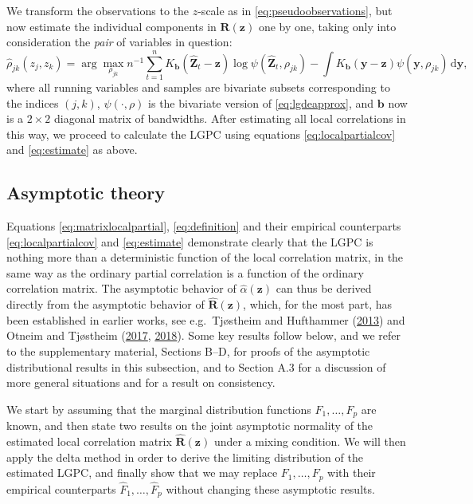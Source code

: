 \documentclass[
  12pt,
  letterpaper]{article}
\newcommand{\z}{\bm{z}}
\newcommand{\hZ}{\widehat{\bm{Z}}}
\newcommand{\y}{\bm{y}}
\newcommand{\R}{\bm{R}}
\newcommand{\hR}{\widehat{\bm{R}}}
\newcommand{\hF}{\widehat{F}}
\newcommand{\hrho}{\widehat{\rho}}
\newcommand{\hh}{\bm{b}}
\newcommand{\halpha}{\widehat{\alpha}}
\theoremstyle{definition}
\theoremstyle{definition}
\theoremstyle{definition}
\theoremstyle{remark}
\begin{document}
We transform the observations to the \(z\)-scale as in \eqref{eq:pseudoobservations}, but now estimate the individual components in \(\R(\z)\) one by one, taking only into consideration the \emph{pair} of variables in question:
\begin{equation}
\hrho_{jk}(z_j, z_k) = \arg\max_{\rho_{jk}} n^{-1} \sum_{t=1}^nK_{\hh}(\hZ_t - \z)\log\psi(\hZ_t, \rho_{jk}) - \int K_{\hh}(\y - \z)\psi(\y, \rho_{jk})\,\textrm{d}\y, 
\label{eq:locallik2}
\end{equation}
where all running variables and samples are bivariate subsets corresponding to the indices \((j,k)\), \(\psi(\cdot, \rho)\) is the bivariate version of \eqref{eq:lgdeapprox}, and \(\hh\) now is a \(2\times2\) diagonal matrix of bandwidths. After estimating all local correlations in this way, we proceed to calculate the LGPC using equations \eqref{eq:localpartialcov} and \eqref{eq:estimate} as above.

\hypertarget{chap:asymptotic}{%
\subsection{Asymptotic theory}\label{chap:asymptotic}}

Equations \eqref{eq:matrixlocalpartial}, \eqref{eq:definition} and their empirical counterparts \eqref{eq:localpartialcov} and \eqref{eq:estimate} demonstrate clearly that the LGPC is nothing more than a deterministic function of the local correlation matrix, in the same way as the ordinary partial correlation is a function of the ordinary correlation matrix. The asymptotic behavior of \(\halpha(\z)\) can thus be derived directly from the asymptotic behavior of \(\hR(\z)\), which, for the most part, has been established in earlier works, see e.g.~Tjøstheim and Hufthammer (\protect\hyperlink{ref-tjostheim2013local}{2013}) and Otneim and Tjøstheim (\protect\hyperlink{ref-otneim2017locally}{2017}, \protect\hyperlink{ref-otneim2017conditional}{2018}). Some key results follow below, and we refer to the supplementary material, Sections B--D, for proofs of the asymptotic distributional results in this subsection, and to Section A.3 for a discussion of more general situations and for a result on consistency.

We start by assuming that the marginal distribution functions \(F_1, \ldots, F_p\) are known, and then state two results on the joint asymptotic normality of the estimated local correlation matrix \(\hR(\z)\) under a mixing condition. We will then apply the delta method in order to derive the limiting distribution of the estimated LGPC, and finally show that we may replace \(F_1,\ldots,F_p\) with their empirical counterparts \(\hF_1,\ldots,\hF_p\) without changing these asymptotic results.
\end{document}
